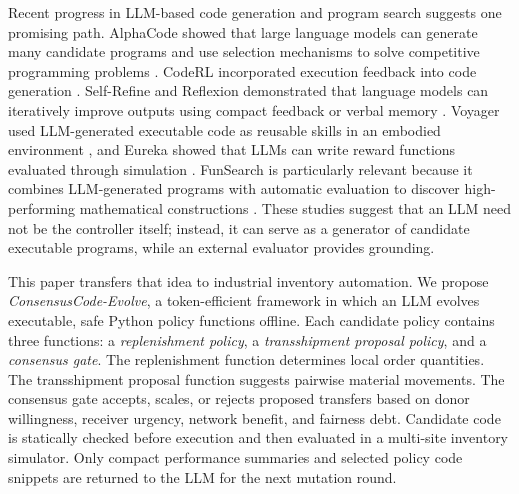 \documentclass[journal]{IEEEtran}
\begin{document}
Recent progress in LLM-based code generation and program search suggests one promising path. AlphaCode showed that large language models can generate many candidate programs and use selection mechanisms to solve competitive programming problems \cite{li2022alphacode}. CodeRL incorporated execution feedback into code generation \cite{le2022coderl}. Self-Refine and Reflexion demonstrated that language models can iteratively improve outputs using compact feedback or verbal memory \cite{madaan2023selfrefine,shinn2023reflexion}. Voyager used LLM-generated executable code as reusable skills in an embodied environment \cite{wang2023voyager}, and Eureka showed that LLMs can write reward functions evaluated through simulation \cite{ma2024eureka}. FunSearch is particularly relevant because it combines LLM-generated programs with automatic evaluation to discover high-performing mathematical constructions \cite{romera2024funsearch}. These studies suggest that an LLM need not be the controller itself; instead, it can serve as a generator of candidate executable programs, while an external evaluator provides grounding.

This paper transfers that idea to industrial inventory automation. We propose \emph{ConsensusCode-Evolve}, a token-efficient framework in which an LLM evolves executable, safe Python policy functions offline. Each candidate policy contains three functions: a \emph{replenishment policy}, a \emph{transshipment proposal policy}, and a \emph{consensus gate}. The replenishment function determines local order quantities. The transshipment proposal function suggests pairwise material movements. The consensus gate accepts, scales, or rejects proposed transfers based on donor willingness, receiver urgency, network benefit, and fairness debt. Candidate code is statically checked before execution and then evaluated in a multi-site inventory simulator. Only compact performance summaries and selected policy code snippets are returned to the LLM for the next mutation round.
\end{document}
